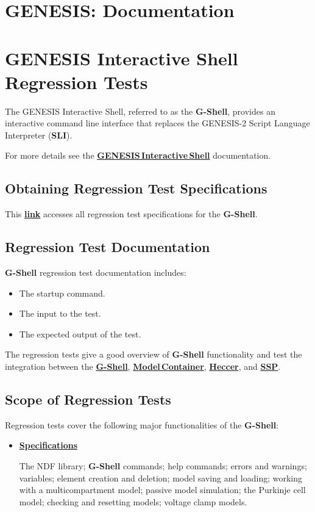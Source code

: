 \documentclass[12pt]{article}
\begin{document}
\section*{GENESIS: Documentation}

\section*{GENESIS Interactive Shell Regression Tests}

The GENESIS Interactive Shell, referred to as the {\bf G-Shell}, provides an interactive command line interface that replaces the GENESIS-2 Script Language Interpreter ({\bf SLI}).

For more details see the \href{../gshell/gshell.tex}{\bf GENESIS\,Interactive\,Shell} documentation.

\subsection*{Obtaining Regression Test Specifications}

This \href{http://www.neurospaces.org/neurospaces_project/gshell/tests/html/specifications/main.html}{\bf link} accesses all regression test specifications for the {\bf G-Shell}.

\subsection*{Regression Test Documentation}

{\bf G-Shell} regression test documentation includes:
\begin{itemize}
\item The startup command.
\item The input to the test.
\item The expected output of the test.
\end{itemize}
The regression tests give a good overview of {\bf G-Shell} functionality and test the integration between the \href{../gshell/gshell.tex}{{\bf G-Shell}}, \href{../model-container/model-container.tex}{\bf Model\,Container}, \href{../heccer/heccer.tex}{\bf Heccer}, and \href{../ssp/ssp.tex}{\bf SSP}.

\subsection*{Scope of Regression Tests}

Regression tests cover the following major functionalities of the {\bf G-Shell}:
\begin{itemize}
\item[]\href{http://www.neurospaces.org/neurospaces_project/gshell/tests/html/index.html}{\bf Specifications}

The NDF library; {\bf G-Shell} commands; help commands; errors and warnings; variables; element creation and deletion; model saving and loading; working with a multicompartment model; passive model simulation; the Purkinje cell model; checking and resetting models; voltage clamp models.

\end{itemize}
\end{document}

